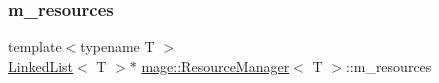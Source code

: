 \hypertarget{classmage_1_1_resource_manager_a77b6bacdb28330b1587c7d18585fdea5}{}\label{classmage_1_1_resource_manager_a77b6bacdb28330b1587c7d18585fdea5} 
\subsubsection{\texorpdfstring{m\+\_\+resources}{m\_resources}}
{\footnotesize\ttfamily template$<$typename T $>$ \\
\hyperlink{classmage_1_1_linked_list}{Linked\+List}$<$ T $>$$\ast$ \hyperlink{classmage_1_1_resource_manager}{mage\+::\+Resource\+Manager}$<$ T $>$\+::m\+\_\+resources\hspace{0.3cm}{\ttfamily [private]}}

